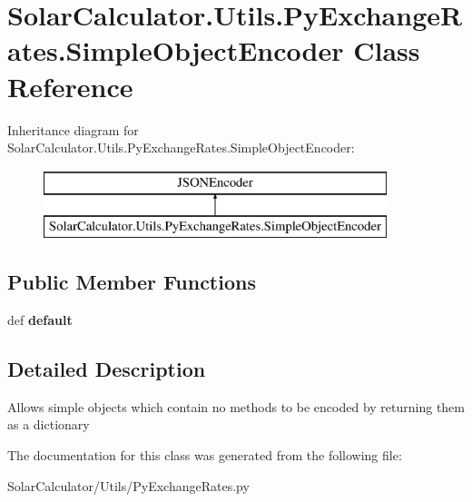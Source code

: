 \hypertarget{class_solar_calculator_1_1_utils_1_1_py_exchange_rates_1_1_simple_object_encoder}{\section{Solar\-Calculator.\-Utils.\-Py\-Exchange\-Rates.\-Simple\-Object\-Encoder Class Reference}
\label{class_solar_calculator_1_1_utils_1_1_py_exchange_rates_1_1_simple_object_encoder}
}
Inheritance diagram for Solar\-Calculator.\-Utils.\-Py\-Exchange\-Rates.\-Simple\-Object\-Encoder\-:\begin{figure}[H]
\begin{center}
\leavevmode
\includegraphics[height=2.000000cm]{class_solar_calculator_1_1_utils_1_1_py_exchange_rates_1_1_simple_object_encoder}
\end{center}
\end{figure}
\subsection*{Public Member Functions}
\begin{DoxyCompactItemize}
\item 
\hypertarget{class_solar_calculator_1_1_utils_1_1_py_exchange_rates_1_1_simple_object_encoder_a4c6f8f5c285ae958e9d4cdf254e50b61}{def {\bfseries default}}\label{class_solar_calculator_1_1_utils_1_1_py_exchange_rates_1_1_simple_object_encoder_a4c6f8f5c285ae958e9d4cdf254e50b61}

\end{DoxyCompactItemize}


\subsection{Detailed Description}
\begin{DoxyVerb}Allows simple objects which contain no methods to be encoded by returning them as a dictionary \end{DoxyVerb}
 

The documentation for this class was generated from the following file\-:\begin{DoxyCompactItemize}
\item 
Solar\-Calculator/\-Utils/Py\-Exchange\-Rates.\-py\end{DoxyCompactItemize}
